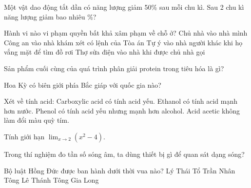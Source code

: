 \begin{ex}
    Một vật dao động tắt dần có năng lượng giảm 50\% sau mỗi chu kì. Sau 2 chu kì năng lượng giảm bao nhiêu \%?
\end{ex}

\begin{ex}
    Hành vi nào vi phạm quyền bất khả xâm phạm về chỗ ở?
    \choice
    {Chủ nhà vào nhà mình}
    {Công an vào nhà khám xét có lệnh của Tòa án}
    {\True Tự ý vào nhà người khác khi họ vắng mặt để tìm đồ rơi}
    {Thợ sửa điện vào nhà khi được chủ nhà gọi}
\end{ex}

\begin{ex}
    Sản phẩm cuối cùng của quá trình phân giải protein trong tiêu hóa là gì?
\end{ex}

\begin{ex}
    Hoa Kỳ có biên giới phía Bắc giáp với quốc gia nào?
\end{ex}

\begin{ex}
    Xét về tính acid:
    \choiceTF
    {\True Carboxylic acid có tính acid yếu.}
    {Ethanol có tính acid mạnh hơn nước.}
    {\True Phenol có tính acid yếu nhưng mạnh hơn alcohol.}
    {Acid acetic không làm đổi màu quỳ tím.}
\end{ex}

\begin{ex}
    Tính giới hạn $\lim_{x \to 2} (x^2 - 4)$.
\end{ex}

\begin{ex}
    Trong thí nghiệm đo tần số sóng âm, ta dùng thiết bị gì để quan sát dạng sóng?
\end{ex}

\begin{ex}
    Bộ luật Hồng Đức được ban hành dưới thời vua nào?
    \choice
    {Lý Thái Tổ}
    {Trần Nhân Tông}
    {\True Lê Thánh Tông}
    {Gia Long}
\end{ex}

